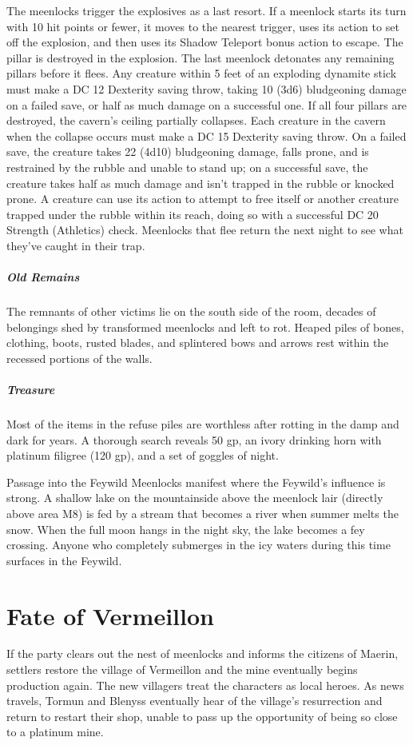 \documentclass[10pt,a4paper,twoside,bg=print,twocolumn,openany,nodeprecatedcode]{dndbook}
\begin{document}
The meenlocks trigger the explosives as a last resort. If a meenlock starts its turn with 10 hit points or fewer, it moves to the nearest trigger, uses its action to set off the explosion, and then uses its Shadow Teleport bonus action to escape. The pillar is destroyed in the explosion. The last meenlock detonates any remaining pillars before it flees. Any creature within 5 feet of an exploding dynamite stick must make a DC 12 Dexterity saving throw, taking 10 (3d6) bludgeoning damage on a failed save, or half as much damage on a successful one. If all four pillars are destroyed, the cavern's ceiling partially collapses. Each creature in the cavern when the collapse occurs must make a DC 15 Dexterity saving throw. On a failed save, the creature takes 22 (4d10) bludgeoning damage, falls prone, and is restrained by the rubble and unable to stand up; on a successful save, the creature takes half as much damage and isn't trapped in the rubble or knocked prone. A creature can use its action to attempt to free itself or another creature trapped under the rubble within its reach, doing so with a successful DC 20 Strength (Athletics) check. Meenlocks that flee return the next night to see what they've caught in their trap.

\subparagraph{Old Remains}
The remnants of other victims lie on the south side of the room, decades of belongings shed by transformed meenlocks and left to rot. Heaped piles of bones, clothing, boots, rusted blades, and splintered bows and arrows rest within the recessed portions of the walls.

\subparagraph{Treasure}
Most of the items in the refuse piles are worthless after rotting in the damp and dark for years. A thorough search reveals 50 gp, an ivory drinking horn with platinum filigree (120 gp), and a set of goggles of night.

\begin{DndSidebar}[float=!b]{Passage into the Feywild}
Meenlocks manifest where the Feywild's influence is strong. A shallow lake on the mountainside above the meenlock lair (directly above area M8) is fed by a stream that becomes a river when summer melts the snow. When the full moon hangs in the night sky, the lake becomes a fey crossing. Anyone who completely submerges in the icy waters during this time surfaces in the Feywild.



\end{DndSidebar}

\section{Fate of Vermeillon}
If the party clears out the nest of meenlocks and informs the citizens of Maerin, settlers restore the village of Vermeillon and the mine eventually begins production again. The new villagers treat the characters as local heroes. As news travels, Tormun and Blenyss eventually hear of the village's resurrection and return to restart their shop, unable to pass up the opportunity of being so close to a platinum mine.
\end{document}
